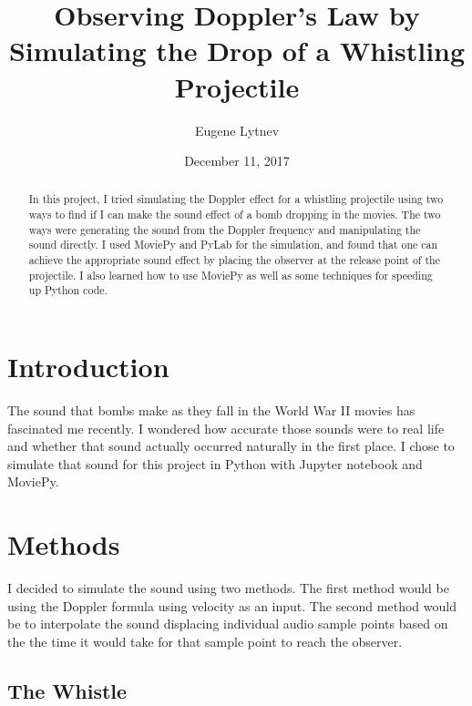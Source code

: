 \documentclass[%
 reprint,
 amsmath,amssymb,
 aps,
]{revtex4-1}
\begin{document}

\title{Observing Doppler's Law by Simulating the Drop of a Whistling Projectile}

\author{Eugene Lytnev}
\date{December 11, 2017}

\begin{abstract}
In this project, I tried simulating the Doppler effect for a whistling projectile using two ways to find if I can make the sound effect of a bomb dropping in the movies. The two ways were generating the sound from the Doppler frequency and manipulating the sound directly. I used MoviePy and PyLab for the simulation, and found that one can achieve the appropriate sound effect by placing the observer at the release point of the projectile. I also learned how to use MoviePy as well as some techniques for speeding up Python code.
\end{abstract}

\maketitle


\section{\label{sec:intro}Introduction}

The sound that bombs make as they fall in the World War II movies has fascinated me recently. I wondered how accurate those sounds were to real life and whether that sound actually occurred naturally in the first place. I chose to simulate that sound for this project in Python with Jupyter notebook and MoviePy.

\section{\label{sec:methods}Methods}

I decided to simulate the sound using two methods. The first method would be using the Doppler formula using velocity as an input. The second method would be to interpolate the sound displacing individual audio sample points based on the the time it would take for that sample point to reach the observer.

\subsection{\label{sec:whistle}The Whistle}
\end{document}
